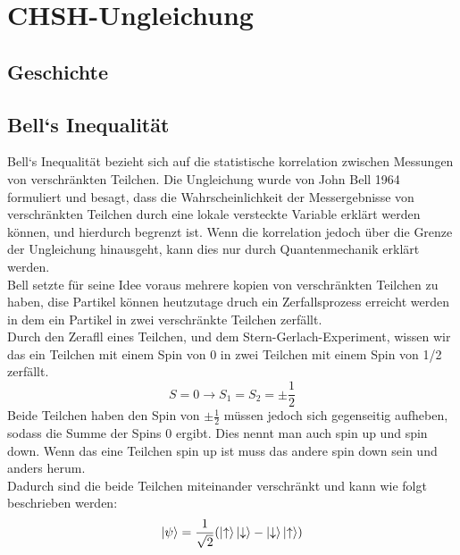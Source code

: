 \section{CHSH-Ungleichung}
\label{sec:chsh}


\subsection{Geschichte}
\label{subsec:chsh_geschichte}


\subsection{Bell`s Inequalität}
\label{subsec:bells_inequality}
Bell`s Inequalität bezieht sich auf die statistische korrelation zwischen Messungen von verschränkten Teilchen.
Die Ungleichung wurde von John Bell 1964 formuliert und besagt, dass die Wahrscheinlichkeit der Messergebnisse von verschränkten Teilchen durch eine lokale versteckte Variable erklärt werden können, und hierdurch begrenzt ist.
Wenn die korrelation jedoch über die Grenze der Ungleichung hinausgeht, kann dies nur durch Quantenmechanik erklärt werden.\\

Bell setzte für seine Idee voraus mehrere kopien von verschränkten Teilchen zu haben, dise Partikel können heutzutage druch ein Zerfallsprozess erreicht werden in dem ein Partikel in zwei verschränkte Teilchen zerfällt.\\

Durch den Zerafll eines Teilchen, und dem Stern-Gerlach-Experiment, wissen wir das ein Teilchen mit einem Spin von 0 in zwei Teilchen mit einem Spin von 1/2 zerfällt.
\begin{equation}
    S = 0 \rightarrow S_1 = S_2 = \pm\frac{1}{2}
\end{equation}
Beide Teilchen haben den Spin von $\pm\frac{1}{2}$ müssen jedoch sich gegenseitig aufheben, sodass die Summe der Spins 0 ergibt.
Dies nennt man auch spin up und spin down. Wenn das eine Teilchen spin up ist muss das andere spin down sein und anders herum.\\
Dadurch sind die beide Teilchen miteinander verschränkt und kann wie folgt beschrieben werden:
\begin{equation}
    \ket{\psi} = \frac{1}{\sqrt{2}}(\ket{\uparrow}\ket{\downarrow} - \ket{\downarrow}\ket{\uparrow})
\end{equation}

